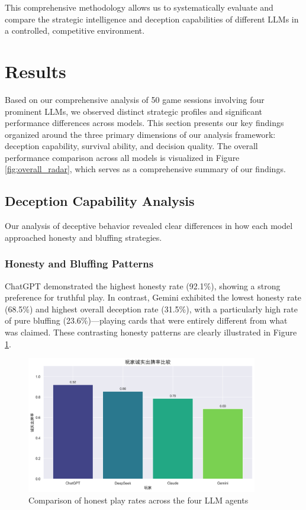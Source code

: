 \documentclass{article}
\begin{document}
This comprehensive methodology allows us to systematically evaluate and compare the strategic intelligence and deception capabilities of different LLMs in a controlled, competitive environment.

\section{Results}
Based on our comprehensive analysis of 50 game sessions involving four prominent LLMs, we observed distinct strategic profiles and significant performance differences across models. This section presents our key findings organized around the three primary dimensions of our analysis framework: deception capability, survival ability, and decision quality. The overall performance comparison across all models is visualized in Figure \ref{fig:overall_radar}, which serves as a comprehensive summary of our findings.

\subsection{Deception Capability Analysis}
Our analysis of deceptive behavior revealed clear differences in how each model approached honesty and bluffing strategies.

\subsubsection{Honesty and Bluffing Patterns}
ChatGPT demonstrated the highest honesty rate (92.1\%), showing a strong preference for truthful play. In contrast, Gemini exhibited the lowest honesty rate (68.5\%) and highest overall deception rate (31.5\%), with a particularly high rate of pure bluffing (23.6\%)—playing cards that were entirely different from what was claimed. These contrasting honesty patterns are clearly illustrated in Figure \ref{fig:honest_play_rate}.

\begin{figure}[H]
    \centering
    \includegraphics[width=0.9\textwidth]{figures/deception_honest_play_rate.png}
    \caption{Comparison of honest play rates across the four LLM agents}
    \label{fig:honest_play_rate}
\end{figure}
\end{document}
